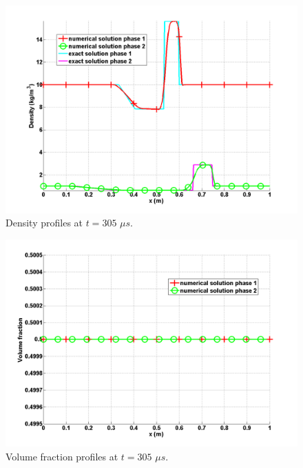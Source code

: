 %
\begin{figure}[H]
\centering
\includegraphics[width=\textwidth]{figures/two_phases_density.png}
\caption{Density profiles at $t=305$ $\mu s$.}
\label{fig:two-indep-fluids-dens-7-eqn-sect4}
\end{figure}
%
\begin{figure}[H]
\centering
\includegraphics[width=\textwidth]{figures/two_phases_volume_fraction.png}
\caption{Volume fraction profiles at $t=305$ $\mu s$.}
\label{fig:two-indep-fluids-vf-7-eqn-sect4}
\end{figure}
%
